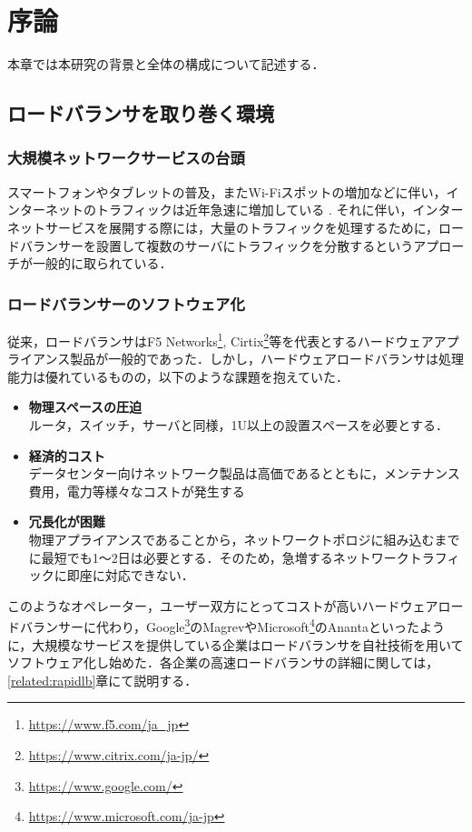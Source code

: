 \chapter{序論}
\label{introduction}
本章では本研究の背景と全体の構成について記述する．

\section{ロードバランサを取り巻く環境}
\label{introduction:background}

\subsection{大規模ネットワークサービスの台頭}
スマートフォンやタブレットの普及，またWi-Fiスポットの増加などに伴い，インターネットのトラフィックは近年急速に増加している \cite{Cisco_Analysis}.
それに伴い，インターネットサービスを展開する際には，大量のトラフィックを処理するために，ロードバランサーを設置して複数のサーバにトラフィックを分散するというアプローチが一般的に取られている．

\subsection{ロードバランサーのソフトウェア化}
\label{introduction:background:software_lb}
従来，ロードバランサはF5 Networks\footnote{\url{https://www.f5.com/ja_jp}}, Cirtix\footnote{\url{https://www.citrix.com/ja-jp/}}等を代表とするハードウェアアプライアンス製品が一般的であった．しかし，ハードウェアロードバランサは処理能力は優れているものの，以下のような課題を抱えていた．
\begin{itemize}
    \item \textbf{物理スペースの圧迫} \\
    ルータ，スイッチ，サーバと同様，1U以上の設置スペースを必要とする．
    \item \textbf{経済的コスト} \\
    データセンター向けネットワーク製品は高価であるとともに，メンテナンス費用，電力等様々なコストが発生する
    \item \textbf{冗長化が困難} \\
    物理アプライアンスであることから，ネットワークトポロジに組み込むまでに最短でも1〜2日は必要とする．そのため，急増するネットワークトラフィックに即座に対応できない．
\end{itemize}

このようなオペレーター，ユーザー双方にとってコストが高いハードウェアロードバランサーに代わり，Google\footnote{\url{https://www.google.com/}}のMagrev\cite{Magrev}やMicrosoft\footnote{\url{https://www.microsoft.com/ja-jp}}のAnanta\cite{ananta}といったように，大規模なサービスを提供している企業はロードバランサを自社技術を用いてソフトウェア化し始めた．各企業の高速ロードバランサの詳細に関しては，\ref{related:rapidlb}章にて説明する．

